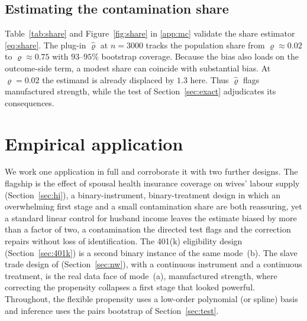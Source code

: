 \documentclass[preprint,11pt,authoryear]{elsarticle}
\theoremstyle{definition}
\begin{document}
\subsection{Estimating the contamination share}\label{sec:shareMC}
Table~\ref{tab:share} and Figure~\ref{fig:share} in \ref{app:mc} validate
the share estimator \eqref{eq:share}. The plug-in $\hat\varrho$ at $n=3000$ tracks
the population share from $\varrho\approx0.02$ to $\varrho\approx0.75$ with
$93$--$95\%$ bootstrap coverage. Because the bias also loads on the outcome-side
term, a modest share can coincide with substantial bias. At $\varrho=0.02$ the
estimand is already displaced by $1.3$ here. Thus $\hat\varrho$ flags manufactured
strength, while the test of Section~\ref{sec:exact} adjudicates its consequences.

\section{Empirical application}\label{sec:empirics}

We work one application in full and corroborate it with two further designs. The
flagship is the effect of spousal health insurance coverage on wives' labour supply
(Section~\ref{sec:hi}), a binary-instrument, binary-treatment design in which an
overwhelming first stage and a small contamination share are both reassuring, yet a
standard linear control for husband income leaves the estimate biased by more than a
factor of two, a contamination the directed test flags and the correction repairs
without loss of identification. The 401(k) eligibility design (Section~\ref{sec:401k})
is a second binary instance of the same mode~(b). The slave trade design of
\citet{nunn2011} (Section~\ref{sec:nw}), with a continuous instrument and a continuous
treatment, is the real data face of mode~(a), manufactured strength, where correcting
the propensity collapses a first stage that looked powerful. Throughout, the flexible
propensity uses a low-order polynomial (or spline) basis and inference uses the pairs
bootstrap of Section~\ref{sec:test}.
\end{document}
